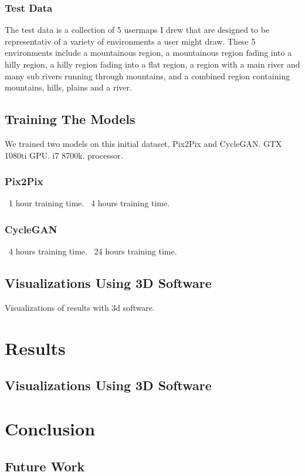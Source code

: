 \documentclass[twocolumn]{article}
\begin{document}
		
	\subsubsection{Test Data}
	
	The test data is a collection of 5 usermaps I drew that are designed to be representativ of a variety of environments a user might draw. These 5 environments include a mountainous region, a mountainous region fading into a hilly region, a hilly region fading into a flat region, a region with a main river and many sub rivers running through mountains, and a combined region containing mountains, hills, plains and a river.
	
	\subsection{Training The Models}
	
	We trained two models on this initial dataset, Pix2Pix and CycleGAN. GTX 1080ti GPU. i7 8700k. processor.
	
	\subsubsection{Pix2Pix}
	~1 hour training time.
	~4 hours training time.
	
	\subsubsection{CycleGAN}
	~4 hours training time.
	~24 hours training time.

	\subsection{Visualizations Using 3D Software}
	
	Visualizations of results with 3d software.

	\section{Results}
	
	\subsection{Visualizations Using 3D Software}

	\section{Conclusion}
	
	\subsection{Future Work}

	
		
  
\end{document}
